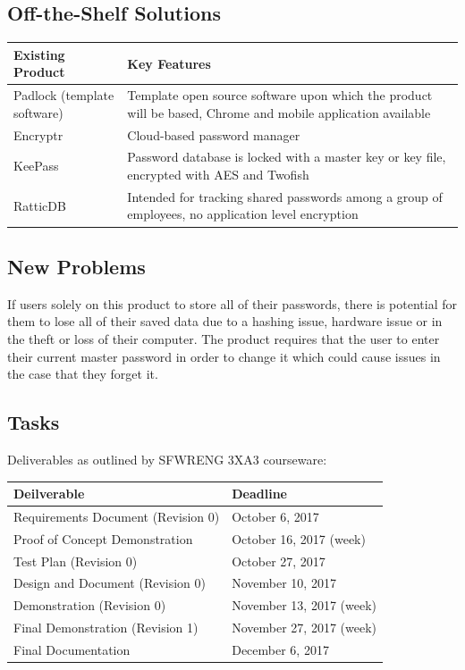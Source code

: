 \documentclass[12pt, titlepage]{article}
\begin{document}
\subsection{Off-the-Shelf Solutions}
\begin{table}[H]
\centering
{}
\begin{tabular}{ | p{3cm} | p{10cm} | }
	\hline
	Existing Product & Key Features \\
	\hline
	Padlock (template software) \cite{PadLockGit} & Template open source software upon which the product will be based, Chrome and mobile application available \\
	\hline
	Encryptr \cite{EncryptrGit} & Cloud-based password manager \\
	\hline
	KeePass \cite{KeePassSite} & Password database is locked with a master key or key file, encrypted with AES and Twofish \\
	\hline
	RatticDB \cite{RatticDBSite} & Intended for tracking shared  passwords among a group of employees, no application level encryption \\
\hline
\end{tabular}
\end{table}


\subsection{New Problems}

If users solely on this product to store all of their passwords, there is potential for them to lose all of their saved data due to a hashing issue, hardware issue or in the theft or loss of their computer. The product requires that the user to enter their current master password in order to change it which could cause issues in the case that they forget it.

\subsection{Tasks}

Deliverables as outlined by SFWRENG 3XA3 courseware:

\begin{table}[H]
\centering
{}
\begin{tabular}{ | p{5cm} | p{9cm} | }
	\hline
	Deilverable & Deadline \\
	\hline
	Requirements Document (Revision 0) & October 6, 2017 \\
	\hline
	Proof of Concept Demonstration & October 16, 2017 (week) \\
	\hline
	Test Plan (Revision 0) & October 27, 2017 \\
	\hline
	Design and Document (Revision 0) & November 10, 2017 \\
	\hline
	Demonstration (Revision 0) & November 13, 2017 (week) \\
	\hline
	Final Demonstration (Revision 1) & November 27, 2017 (week) \\
	\hline
	Final Documentation & December 6, 2017 \\
\hline
\end{tabular}
\end{table}
\end{document}
